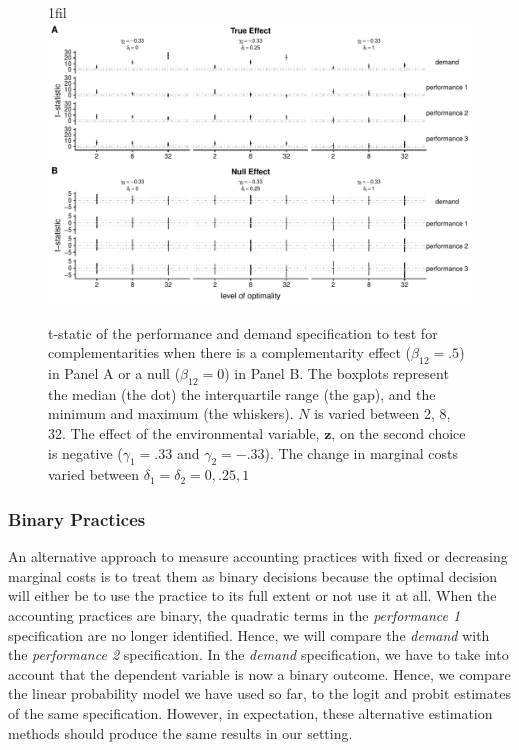 \documentclass[12pt]{article}
\makeatletter
\newcommand*{\centerfloat}{%
  \parindent \z@
  \leftskip \z@ \@plus 1fil \@minus \textwidth
  \rightskip\leftskip
  \parfillskip \z@skip}
\makeatother
\begin{document}
\begin{figure}
\centerfloat
\includegraphics[width=450px]{figure-latex/delta_new_plot.pdf}
\caption[The Error Rate and Power with Different Levels of Marginal Costs]
{\label{delta} t-static of the performance and demand specification to test
for complementarities when there is a complementarity effect ($\beta_{12} = .5$)
in Panel A or a null ($\beta_{12} = 0$) in Panel B. The boxplots represent the median (the dot) the interquartile range (the gap), and the minimum and maximum (the whiskers). $N$ is varied between 2, 8, 32. The effect of the environmental variable, $\mathbf{z}$, on the second choice is negative ($\gamma_1 = .33$ and $\gamma_2 = -.33$). The change in marginal costs varied between $\delta_1 = \delta_2 = 0, .25, 1$}
\end{figure}



\subsubsection{Binary Practices}

An alternative approach to measure accounting practices with fixed or decreasing marginal costs is to treat them as binary decisions because the optimal decision will either be to use the practice to its full extent or not use it at all. When the accounting practices are binary, the quadratic terms in the \emph{performance 1} specification are no longer identified. Hence, we will compare the \emph{demand} with the \emph{performance 2} specification. In the \emph{demand} specification, we have to take into account that the dependent variable is now a binary outcome. Hence, we compare the linear probability model we have used so far, to the logit and probit estimates of the same specification. However, in expectation, these alternative estimation methods should produce the same results in our setting. 
\end{document}

